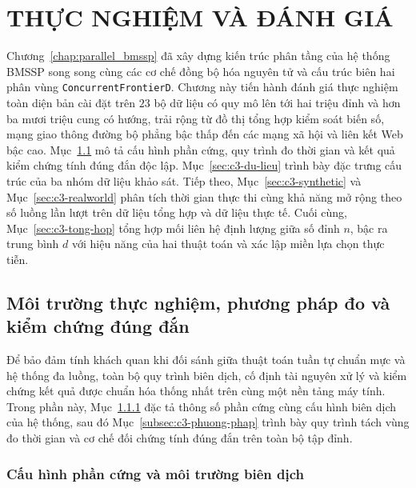 \chapter{THỰC NGHIỆM VÀ ĐÁNH GIÁ}
\label{ch:thuc-nghiem}
\hypersetup{linkcolor=black, citecolor=black, urlcolor=black}

Chương~\ref{chap:parallel_bmssp} đã xây dựng kiến trúc phân tầng của hệ thống BMSSP song song cùng các cơ chế đồng bộ hóa nguyên tử và cấu trúc biên hai phân vùng \texttt{Concurrent\allowbreak FrontierD}. Chương này tiến hành đánh giá thực nghiệm toàn diện bản cài đặt trên $23$ bộ dữ liệu có quy mô lên tới hai triệu đỉnh và hơn ba mươi triệu cung có hướng, trải rộng từ đồ thị tổng hợp kiểm soát biến số, mạng giao thông đường bộ phẳng bậc thấp đến các mạng xã hội và liên kết Web bậc cao. Mục~\ref{sec:c3-moi-truong} mô tả cấu hình phần cứng, quy trình đo thời gian và kết quả kiểm chứng tính đúng đắn độc lập. Mục~\ref{sec:c3-du-lieu} trình bày đặc trưng cấu trúc của ba nhóm dữ liệu khảo sát. Tiếp theo, Mục~\ref{sec:c3-synthetic} và Mục~\ref{sec:c3-realworld} phân tích thời gian thực thi cùng khả năng mở rộng theo số luồng lần lượt trên dữ liệu tổng hợp và dữ liệu thực tế. Cuối cùng, Mục~\ref{sec:c3-tong-hop} tổng hợp mối liên hệ định lượng giữa số đỉnh $n$, bậc ra trung bình $d$ với hiệu năng của hai thuật toán và xác lập miền lựa chọn thực tiễn.

\section{Môi trường thực nghiệm, phương pháp đo và kiểm chứng đúng đắn}\label{sec:c3-moi-truong}

Để bảo đảm tính khách quan khi đối sánh giữa thuật toán tuần tự chuẩn mực và hệ thống đa luồng, toàn bộ quy trình biên dịch, cố định tài nguyên xử lý và kiểm chứng kết quả được chuẩn hóa thống nhất trên cùng một nền tảng máy tính. Trong phần này, Mục~\ref{subsec:c3-phan-cung} đặc tả thông số phần cứng cùng cấu hình biên dịch của hệ thống, sau đó Mục~\ref{subsec:c3-phuong-phap} trình bày quy trình tách vùng đo thời gian và cơ chế đối chứng tính đúng đắn trên toàn bộ tập đỉnh.

\subsection{Cấu hình phần cứng và môi trường biên dịch}\label{subsec:c3-phan-cung}


